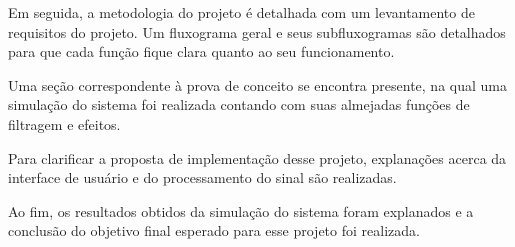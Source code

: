 Em seguida, a metodologia do projeto é detalhada com um levantamento de requisitos do projeto. Um fluxograma geral e seus subfluxogramas são detalhados para que cada função fique clara quanto ao seu funcionamento.

Uma seção correspondente à prova de conceito se encontra presente, na qual uma simulação do sistema foi realizada contando com suas almejadas funções de filtragem e efeitos.

Para clarificar a proposta de implementação desse projeto, explanações acerca da interface de usuário e do processamento do sinal são realizadas.

Ao fim, os resultados obtidos da simulação do sistema foram explanados e a conclusão do objetivo final esperado para esse projeto foi realizada.
